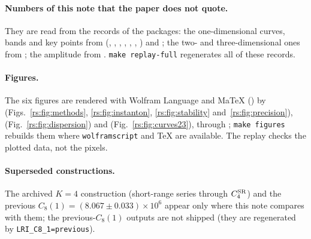 \paragraph{Numbers of this note that the paper does not quote.} They are read from the records of
the packages: the one-dimensional curves, bands and key points from
 (,
, , , ,
, ) and
; the two- and three-dimensional ones from
; the amplitude from .
\texttt{make replay-full} regenerates all of these records.

\paragraph{Figures.} The six figures are rendered with Wolfram Language and MaTeX
() by 
(Figs.~\ref{rs:fig:methods}, \ref{rs:fig:instanton}, \ref{rs:fig:stability} and~\ref{rs:fig:precision}),
 (Fig.~\ref{rs:fig:dispersion}) and
 (Fig.~\ref{rs:fig:curves23}), through ; \texttt{make figures} rebuilds them where
\texttt{wolframscript} and TeX are available. The replay checks the plotted data, not the pixels.

\paragraph{Superseded constructions.} The archived $K=4$ construction (short-range series through
$C^{\mathrm{SR}}_4$) and the previous $C_8(1)=(8.067\pm0.033)\times10^6$ appear only where this note compares
with them; the previous-$C_8(1)$ outputs are not shipped (they are regenerated by
\texttt{LRI\_C8\_1=previous}).


